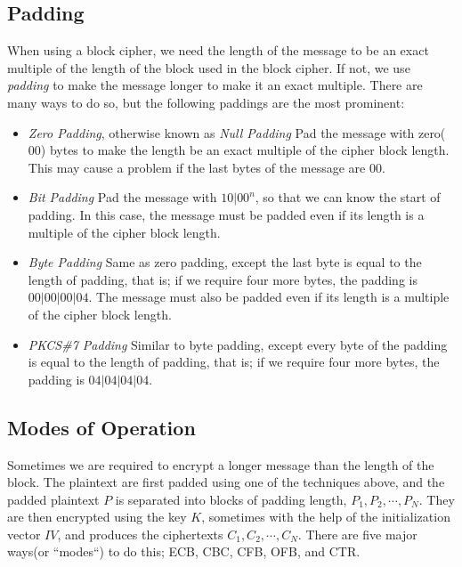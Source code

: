 \documentclass{report}
\begin{document}
		\subsection{Padding}
		When using a block cipher, we need the length of the message to be an exact multiple of the length of the block used in the block cipher. If not, we use \emph{padding} to make the message longer to make it an exact multiple. There are many ways to do so, but the following paddings are the most prominent:
		\begin{itemize}
			\item \emph{Zero Padding}, otherwise known as \emph{Null Padding}
			\subitem Pad the message with zero($00$) bytes to make the length be an exact multiple of the cipher block length. This may cause a problem if the last bytes of the message are $00$.
			
			\item \emph{Bit Padding}
			\subitem Pad the message with $10|00^n$, so that we can know the start of padding. In this case, the message must be padded even if its length is a multiple of the cipher block length.
			
			\item \emph{Byte Padding}
			\subitem Same as zero padding, except the last byte is equal to the length of padding, that is; if we require four more bytes, the padding is $00|00|00|04$. The message must also be padded even if its length is a multiple of the cipher block length.
			
			\item \emph{PKCS\#7 Padding}
			\subitem Similar to byte padding, except every byte of the padding is equal to the length of padding, that is; if we require four more bytes, the padding is $04|04|04|04$.
		\end{itemize}
	
		\subsection{Modes of Operation}
			Sometimes we are required to encrypt a longer message than the length of the block. The plaintext are first padded using one of the techniques above, and the padded plaintext $P$ is separated into blocks of padding length, $P_1,P_2,\cdots,P_N$. They are then encrypted using the key $K$, sometimes with the help of the initialization vector $IV$, and produces the ciphertexts $C_1,C_2,\cdots,C_N$. There are five major ways(or ``modes``) to do this; ECB, CBC, CFB, OFB, and CTR.
			
\end{document}
